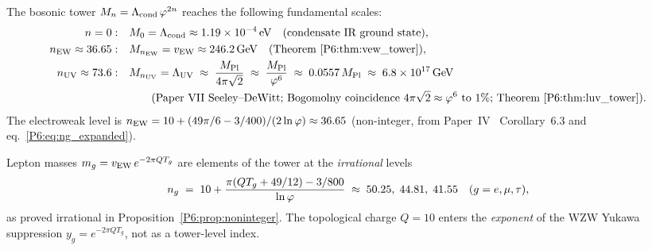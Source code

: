 \begin{corollary}
\label{P6:cor:tower_scales}
The bosonic tower $M_n = \Lambda_{\mathrm{cond}}\,\varphi^{2n}$ reaches the following
fundamental scales:
\begin{align}
  n = 0: & \quad M_0 = \Lambda_{\mathrm{cond}} \approx 1.19\times10^{-4}\,\mathrm{eV}
             \quad(\text{condensate IR ground state}), \\
  n_{\mathrm{EW}} \approx 36.65: & \quad M_{n_{\mathrm{EW}}} = v_{\mathrm{EW}} \approx 246.2\,\mathrm{GeV}
             \quad(\text{Theorem~\ref{P6:thm:vew_tower}}), \\
  n_{\mathrm{UV}} \approx 73.6: & \quad M_{n_{\mathrm{UV}}} = \Lambda_{\mathrm{UV}}
             \;\approx\; \frac{M_{\mathrm{Pl}}}{4\pi\sqrt{2}}
             \;\approx\; \frac{M_{\mathrm{Pl}}}{\varphi^6}
             \;\approx\; 0.0557\,M_{\mathrm{Pl}}
             \;\approx\; 6.8\times10^{17}\,\mathrm{GeV}
             \notag\\
             & \quad\qquad(\text{Paper~VII Seeley--DeWitt; Bogomolny
             coincidence $4\pi\sqrt{2}\approx\varphi^6$ to $1\%$;
             Theorem~\ref{P6:thm:luv_tower}}).
\end{align}
The electroweak level is
$n_{\mathrm{EW}} = 10 + (49\pi/6-3/400)/(2\ln\varphi) \approx 36.65$
(non-integer, from Paper~IV~\cite{Paper4} Corollary~6.3 and eq.~\eqref{P6:eq:ng_expanded}).

Lepton masses $m_g = v_{\mathrm{EW}}\,e^{-2\pi Q T_g}$ are elements of the tower at
the \emph{irrational} levels
\[
  n_g \;=\; 10 + \frac{\pi(QT_g+49/12)-3/800}{\ln\varphi}
  \;\approx\; 50.25,\; 44.81,\; 41.55
  \quad (g=e,\mu,\tau),
\]
as proved irrational in Proposition~\ref{P6:prop:noninteger}.
The topological charge $Q=10$ enters the \emph{exponent} of the WZW Yukawa
suppression $y_g = e^{-2\pi Q T_g}$, not as a tower-level index.
\end{corollary}

